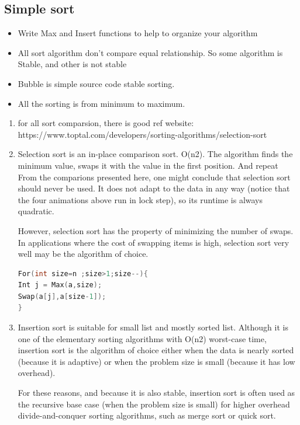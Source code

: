 \documentclass[a4paper,11pt,twoside]{book}
\begin{document}
\subsection{Simple sort}
\begin{itemize}
\item Write Max and Insert functions to help to organize your algorithm
\item All sort algorithm don't compare equal relationship. So some algorithm is Stable, and other is not stable
\item Bubble is simple source code stable sorting. 
\item All the sorting is from minimum to maximum.
\end{itemize}
 
\begin{enumerate}
\item for all sort comparsion, there is good ref website: https://www.toptal.com/developers/sorting-algorithms/selection-sort

\item Selection sort is an in-place comparison sort. O(n2). The algorithm finds the minimum value, swaps it with the value in the first position.  And repeat From the comparions presented here, one might conclude that selection sort should never be used. It does not adapt to the data in any way (notice that the four animations above run in lock step), so its runtime is always quadratic.

However, selection sort has the property of minimizing the number of swaps. In applications where the cost of swapping items is high, selection sort very well may be the algorithm of choice.
\begin{lstlisting}[frame=single, language=c++]
For(int size=n ;size>1;size--){
Int j = Max(a,size);
Swap(a[j],a[size-1]);
}
\end{lstlisting}

\item Insertion sort is suitable for small list and mostly sorted list. Although it is one of the elementary sorting algorithms with O(n2) worst-case time, insertion sort is the algorithm of choice either when the data is nearly sorted (because it is adaptive) or when the problem size is small (because it has low overhead).

For these reasons, and because it is also stable, insertion sort is often used as the recursive base case (when the problem size is small) for higher overhead divide-and-conquer sorting algorithms, such as merge sort or quick sort.


\end{enumerate}
\end{document}
